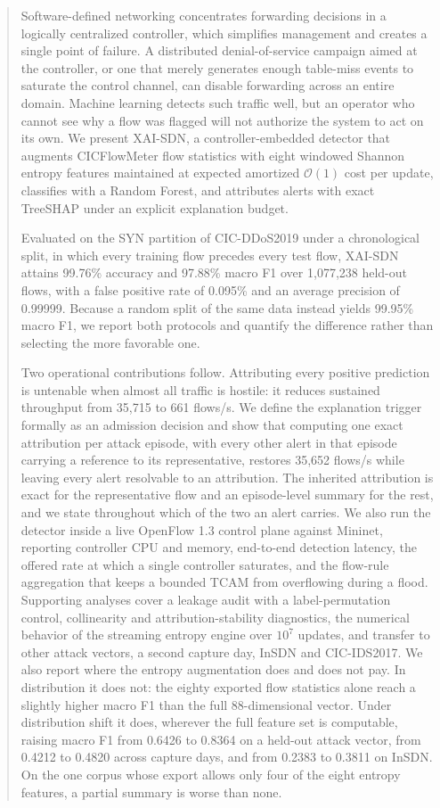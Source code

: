 \documentclass{ieeeaccess}
\begin{document}
\begin{abstract}
Software-defined networking concentrates forwarding decisions in a logically centralized controller, which simplifies management and creates a single point of failure. A distributed denial-of-service campaign aimed at the controller, or one that merely generates enough table-miss events to saturate the control channel, can disable forwarding across an entire domain. Machine learning detects such traffic well, but an operator who cannot see why a flow was flagged will not authorize the system to act on its own. We present XAI-SDN, a controller-embedded detector that augments CICFlowMeter flow statistics with eight windowed Shannon entropy features maintained at expected amortized $\mathcal{O}(1)$ cost per update, classifies with a Random Forest, and attributes alerts with exact TreeSHAP under an explicit explanation budget.

Evaluated on the SYN partition of CIC-DDoS2019 under a chronological split, in which every training flow precedes every test flow, XAI-SDN attains 99.76\% accuracy and 97.88\% macro F1 over 1,077,238 held-out flows, with a false positive rate of 0.095\% and an average precision of 0.99999. Because a random split of the same data instead yields 99.95\% macro F1, we report both protocols and quantify the difference rather than selecting the more favorable one.

Two operational contributions follow. Attributing every positive prediction is untenable when almost all traffic is hostile: it reduces sustained throughput from 35,715 to 661 flows/s. We define the explanation trigger formally as an admission decision and show that computing one exact attribution per attack episode, with every other alert in that episode carrying a reference to its representative, restores 35,652 flows/s while leaving every alert resolvable to an attribution. The inherited attribution is exact for the representative flow and an episode-level summary for the rest, and we state throughout which of the two an alert carries. We also run the detector inside a live OpenFlow 1.3 control plane against Mininet, reporting controller CPU and memory, end-to-end detection latency, the offered rate at which a single controller saturates, and the flow-rule aggregation that keeps a bounded TCAM from overflowing during a flood. Supporting analyses cover a leakage audit with a label-permutation control, collinearity and attribution-stability diagnostics, the numerical behavior of the streaming entropy engine over $10^{7}$ updates, and transfer to other attack vectors, a second capture day, InSDN and CIC-IDS2017. We also report where the entropy augmentation does and does not pay. In distribution it does not: the eighty exported flow statistics alone reach a slightly higher macro F1 than the full 88-dimensional vector. Under distribution shift it does, wherever the full feature set is computable, raising macro F1 from 0.6426 to 0.8364 on a held-out attack vector, from 0.4212 to 0.4820 across capture days, and from 0.2383 to 0.3811 on InSDN. On the one corpus whose export allows only four of the eight entropy features, a partial summary is worse than none.
\end{abstract}
\end{document}
